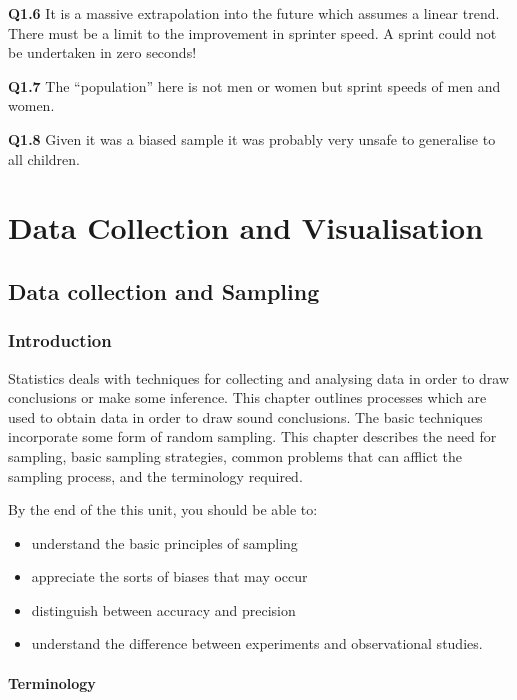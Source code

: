 \documentclass[
  oneside]{krantz}
\begin{document}
\textbf{Q1.6} It is a massive extrapolation into the future which assumes a linear trend. There must be a limit to the improvement in sprinter speed. A sprint could not be undertaken in zero seconds!

\textbf{Q1.7} The ``population'' here is not men or women but sprint speeds of men and women.

\textbf{Q1.8} Given it was a biased sample it was probably very unsafe to generalise to all children.

\hypertarget{part-data-collection-and-visualisation}{%
\part{Data Collection and Visualisation}\label{part-data-collection-and-visualisation}}

\hypertarget{sampling}{%
\chapter{Data collection and Sampling}\label{sampling}}

\hypertarget{INTsamp}{%
\section{Introduction}\label{INTsamp}}

Statistics deals with techniques for collecting and analysing data in order to draw conclusions or make some inference. This chapter outlines processes which are used to obtain data in order to draw sound conclusions. The basic techniques incorporate some form of random sampling. This chapter describes the need for sampling, basic sampling strategies, common problems that can afflict the sampling process, and the terminology required.

By the end of the this unit, you should be able to:

\begin{itemize}
\item
  understand the basic principles of sampling
\item
  appreciate the sorts of biases that may occur
\item
  distinguish between accuracy and precision
\item
  understand the difference between experiments and observational studies.
\end{itemize}

\hypertarget{terminology}{%
\subsection{Terminology}\label{terminology}}
\end{document}

